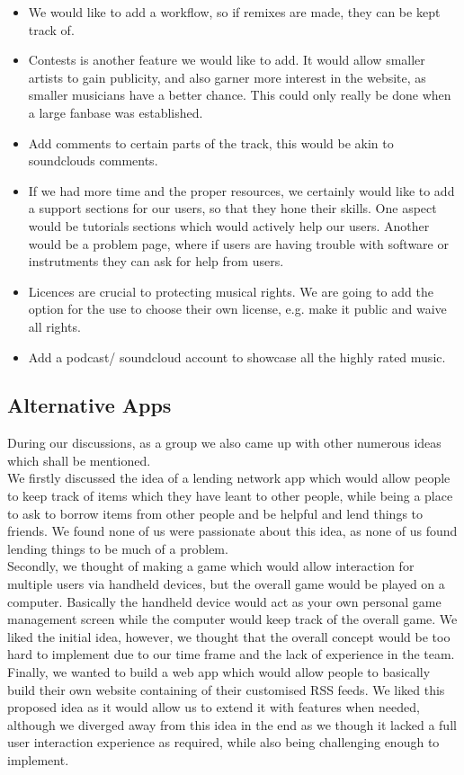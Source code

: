 \documentclass{article}
\begin{document}
\begin{itemize}
  \item We would like to add a workflow, so if remixes are made, they can be kept track of.
  \item Contests is another feature we would like to add. It would allow smaller artists to gain publicity, and also garner more interest in the website, as smaller musicians have a better chance. This could only really be done when a large fanbase was established.
  \item Add comments to certain parts of the track, this would be akin to soundclouds comments.
  \item If we had more time and the proper resources, we certainly would like to add a support sections for our users, so that they hone their skills. One aspect would be tutorials sections which would actively help our users. Another would be a problem page, where if users are having trouble with software or instrutments they can ask for help from users. 
  \item Licences are crucial to protecting musical rights. We are going to add the option for the use to choose their own license, e.g. make it public and waive all rights.
  \item Add a podcast/ soundcloud account to showcase all the highly rated music.
\end{itemize}

\subsection{Alternative Apps}
During our discussions, as a group we also came up with other numerous ideas which shall be mentioned. \\
We firstly discussed the idea of a lending network app which would allow people to keep track of items which they have leant to other people, while being a place to ask to borrow items from other people and be helpful and lend things to friends. We found none of us were passionate about this idea, as none of us found lending things to be much of a problem. \\
Secondly, we thought of making a game which would allow interaction for multiple users via handheld devices, but the overall game would be played on a computer. Basically the handheld device would act as your own personal game management screen while the computer would keep track of the overall game. We liked the initial idea, however, we thought that the overall concept would be too hard to implement due to our time frame and the lack of experience in the team. \\
Finally, we wanted to build a web app which would allow people to basically build their own website containing of their customised RSS feeds. We liked this proposed idea as it would allow us to extend it with features when needed, although we diverged away from this idea in the end as we though it lacked a full user interaction experience as required, while also being challenging enough to implement.
\end{document}
